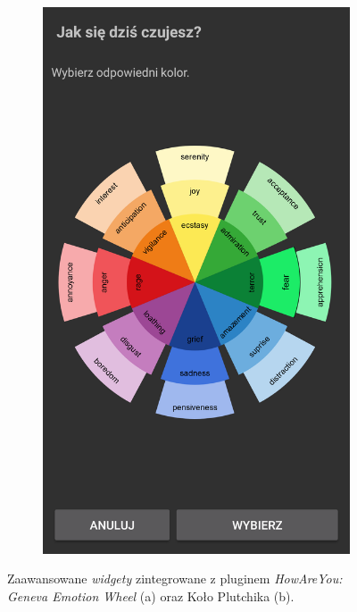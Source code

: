 \begin{itemize}
\begin{figure}[H]
\begin{subfigure}{0.35\textwidth}
			\subcaption{\label{subfigure_a}}
		\end{subfigure}
		\begin{subfigure}{0.35\textwidth}
			\centering
			\includegraphics[scale=0.22]{rozdzial6/jspsych-plutchik-wheel-2}
			\subcaption{\label{subfigure_b}}
		\end{subfigure}
		\caption{ Zaawansowane \textit{widgety} zintegrowane z pluginem \textit{HowAreYou: } \textit{Geneva Emotion Wheel} (a) oraz Koło Plutchika (b).}
	\end{figure}
	
\end{itemize}
